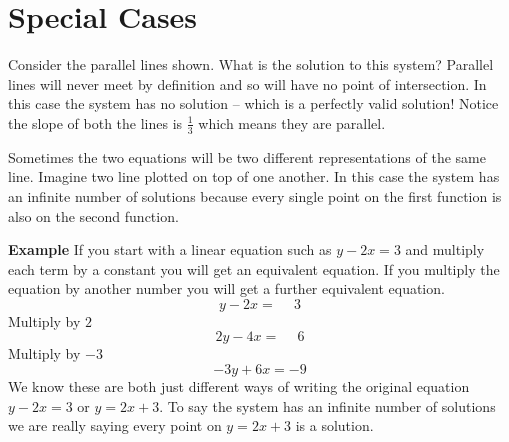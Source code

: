  \section*{Special Cases}
  \begin{multicols}{2}
  Consider the parallel lines shown. What is the solution to this system? Parallel lines will never meet by definition and so will have no point of intersection. In this case the system has no solution -- which is a perfectly valid solution! Notice the slope of both the lines is $\frac{1}{3}$ which means they are parallel.
  
  Sometimes the two equations will be two different representations of the same line. Imagine two line plotted on top of one another. In this case the system has an infinite number of solutions because every single point on the first function is also on the second function. 
 	\columnbreak
 	\begin{center}
 	\end{center}
 \end{multicols}
 
 \textbf{Example} If you start with a linear equation such as $y -2 x =3$ and multiply each term by a constant you will get an equivalent equation. If you multiply the equation by another number you
 will get a further equivalent equation.
 \[y -2 x =\phantom{-}3 \]
 Multiply by $2$
\[2 y -4 x =\phantom{-}6\]
 Multiply by $-3$
\[-3y +6x = -9\]
 We know these are both just different ways of writing the original equation $y -2 x =3$ or $y =2 x +3$. To say the system has an infinite number of solutions we are really saying every point
 on $y =2 x +3$ is a solution. 
 
